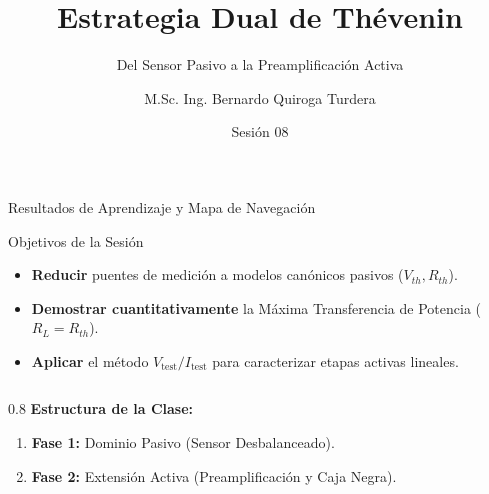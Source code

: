 \documentclass[aspectratio=169, 10pt]{beamer}
\title[Estrategia Dual de Thévenin]{Estrategia Dual de Thévenin}
\subtitle{Del Sensor Pasivo a la Preamplificación Activa}
\author[M.Sc. Ing. B. Quiroga]{M.Sc. Ing. Bernardo Quiroga Turdera}
\institute[UCB Tarija]{IMT-121 Circuitos Electrónicos I | UCB Sede Tarija}
\date{Sesión 08}
\begin{document}
\begin{frame}
    \titlepage
\end{frame}

\begin{frame}{Resultados de Aprendizaje y Mapa de Navegación}
    \begin{block}{Objetivos de la Sesión}
        \begin{itemize}
            \item \textbf{Reducir} puentes de medición a modelos canónicos pasivos ($V_{th}, R_{th}$).
            \item \textbf{Demostrar cuantitativamente} la Máxima Transferencia de Potencia ($R_L = R_{th}$).
            \item \textbf{Aplicar} el método $V_{\text{test}} / I_{\text{test}}$ para caracterizar etapas activas lineales.
        \end{itemize}
    \end{block}
    
    \vspace{0.4cm}
    \begin{columns}
        \begin{column}{0.8\textwidth}
            \textbf{Estructura de la Clase:}
            \begin{enumerate}
                \item \textbf{Fase 1:} Dominio Pasivo (Sensor Desbalanceado).
                \item \textbf{Fase 2:} Extensión Activa (Preamplificación y Caja Negra).
            \end{enumerate}
        \end{column}
    \end{columns}
\end{frame}
\end{document}
